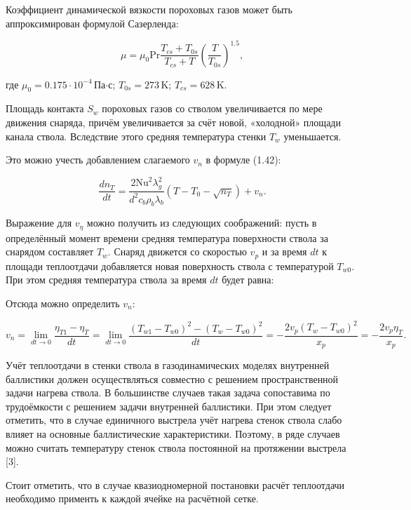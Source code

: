 \documentclass[14pt, a4paper]{report} %
\begin{document}
Коэффициент динамической вязкости пороховых газов может быть аппроксимирован формулой Сазерленда:

\begin{equation}
\mu = \mu_0 \mathrm{Pr} \frac{T_{cs} + T_{0s}}{T_{cs} + T} \left( \frac{T}{T_{0s}} \right)^{1.5},
\tag{1.43}
\end{equation}

где \( \mu_0 = 0.175 \cdot 10^{-4} \, \text{Па·с} \); \( T_{0s} = 273 \, \text{K} \); \( T_{cs} = 628 \, \text{K} \).

Площадь контакта \( S_w \) пороховых газов со стволом увеличивается по мере движения снаряда, причём увеличивается за счёт новой, «холодной» площади канала ствола. Вследствие этого средняя температура стенки \( T_w \) уменьшается.

Это можно учесть добавлением слагаемого \( v_n \) в формуле (1.42):

\begin{equation}
\frac{dn_T}{dt} = \frac{2 \mathrm{Nu}^2 \lambda_g^2}{d^2 c_b \rho_b \lambda_b} \left( T - T_0 - \sqrt{n_T} \right) + v_n.
\end{equation}

Выражение для \( v_\eta \) можно получить из следующих соображений: пусть в определённый момент времени средняя температура поверхности ствола за снарядом составляет \( T_w \). Снаряд движется со скоростью \( v_p \) и за время \( dt \) к площади теплоотдачи добавляется новая поверхность ствола с температурой \( T_{w0} \). При этом средняя температура ствола за время \( dt \) будет равна:

Отсюда можно определить \( v_n \):

\[
v_n = \lim_{dt \to 0} \frac{\eta_{T1} - \eta_T}{dt} = \lim_{dt \to 0} \frac{(T_{w1} - T_{w0})^2 - (T_w - T_{w0})^2}{dt} = -\frac{2v_p (T_w - T_{w0})^2}{x_p} = -\frac{2v_p \eta_T}{x_p}.
\]

Учёт теплоотдачи в стенки ствола в газодинамических моделях внутренней баллистики должен осуществляться совместно с решением пространственной задачи нагрева ствола. В большинстве случаев такая задача сопоставима по трудоёмкости с решением задачи внутренней
баллистики. При этом следует отметить, что в случае единичного выстрела учёт нагрева стенок ствола слабо влияет на основные баллистические характеристики. Поэтому, в ряде случаев можно считать температуру стенок ствола постоянной на протяжении выстрела [3].

Стоит отметить, что в случае квазиодномерной постановки расчёт теплоотдачи необходимо применть к каждой ячейке на расчётной сетке.
\end{document}
